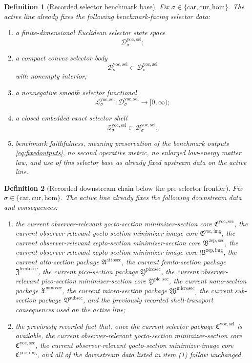 \documentclass[11pt]{article}
\newcommand{\Car}{\mathrm{car}}
\newcommand{\Cur}{\mathrm{cur}}
\newcommand{\Hom}{\mathrm{hom}}
\newcommand{\SubSectionPackage}{\mathfrak V^{\mathrm{subsec}}}
\newcommand{\MicroSectionPackage}{\mathfrak W^{\mathrm{microsec}}}
\newcommand{\NanoSectionPackage}{\mathfrak X^{\mathrm{nanosec}}}
\newcommand{\PicoSectionPackage}{\mathfrak Y^{\mathrm{picosec}}}
\newcommand{\PicoMinSectionCore}{\mathfrak Y^{\mathrm{pic,sec}}}
\newcommand{\FemtoSectionPackage}{\mathfrak Z^{\mathrm{femtosec}}}
\newcommand{\AttoSectionPackage}{\mathfrak A^{\mathrm{attosec}}}
\newcommand{\ZeptoImageCore}{\mathfrak B^{\mathrm{zep,img}}}
\newcommand{\ZeptoMinSectionCore}{\mathfrak B^{\mathrm{zep,sec}}}
\newcommand{\YoctoImageCore}{\mathfrak C^{\mathrm{yoc,img}}}
\newcommand{\YoctoMinSectionCore}{\mathfrak C^{\mathrm{yoc,sec}}}
\newcommand{\YoctoSelectorPackage}{\mathfrak C^{\mathrm{yoc,sel}}}
\newcommand{\YoctoSelectorSpace}[1]{\mathcal D_{#1}^{\mathrm{yoc,sel}}}
\newcommand{\YoctoSelectorBody}[1]{\mathcal B_{#1}^{\mathrm{yoc,sel}}}
\newcommand{\YoctoSelectorFunctional}[1]{\mathscr L_{#1}^{\mathrm{yoc,sel}}}
\newcommand{\YoctoSelectorShell}[1]{\mathcal Z_{#1}^{\mathrm{yoc,sel}}}
\newtheorem{definition}{Definition}
\begin{document}
\begin{definition}[Recorded selector benchmark base]
\label{def:selectorbase}
Fix \(\sigma\in\{\Car,\Cur,\Hom\}\). The active line already fixes the following benchmark-facing selector data:
\begin{enumerate}
    \item a finite-dimensional Euclidean selector state space
    \[
    \YoctoSelectorSpace{\sigma};
    \]
    \item a compact convex selector body
    \[
    \YoctoSelectorBody{\sigma}\subset\YoctoSelectorSpace{\sigma}
    \]
    with nonempty interior;
    \item a nonnegative smooth selector functional
    \[
    \YoctoSelectorFunctional{\sigma}:\YoctoSelectorSpace{\sigma}\to[0,\infty);
    \]
    \item a closed embedded exact selector shell
    \[
    \YoctoSelectorShell{\sigma}\subset\YoctoSelectorBody{\sigma};
    \]
    \item benchmark faithfulness, meaning preservation of the benchmark outputs \eqref{eq:fixedoutputs}, no second operative metric, no enlarged low-energy matter law, and use of this selector base as already fixed upstream data on the active line.
\end{enumerate}
\end{definition}

\begin{definition}[Recorded downstream chain below the pre-selector frontier]
\label{def:downstream}
Fix \(\sigma\in\{\Car,\Cur,\Hom\}\). The active line already fixes the following downstream data and consequences:
\begin{enumerate}
    \item the current observer-relevant yocto-section minimizer-section core \(\YoctoMinSectionCore\), the current observer-relevant yocto-section minimizer-image core \(\YoctoImageCore\), the current observer-relevant zepto-section minimizer-section core \(\ZeptoMinSectionCore\), the current observer-relevant zepto-section minimizer-image core \(\ZeptoImageCore\), the current atto-section package \(\AttoSectionPackage\), the current femto-section package \(\FemtoSectionPackage\), the current pico-section package \(\PicoSectionPackage\), the current observer-relevant pico-section minimizer-section core \(\PicoMinSectionCore\), the current nano-section package \(\NanoSectionPackage\), the current micro-section package \(\MicroSectionPackage\), the current sub-section package \(\SubSectionPackage\), and the previously recorded shell-transport consequences used on the active line;
    \item the previously recorded fact that, once the current selector package \(\YoctoSelectorPackage\) is available, the current observer-relevant yocto-section minimizer-section core \(\YoctoMinSectionCore\), the current observer-relevant yocto-section minimizer-image core \(\YoctoImageCore\), and all of the downstream data listed in item (1) follow unchanged.
\end{enumerate}
\end{definition}
\end{document}
